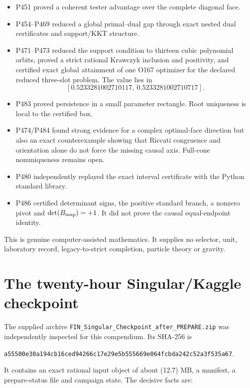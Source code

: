 \documentclass[11pt,a4paper]{article}
\theoremstyle{definition}
\theoremstyle{remark}
\begin{document}
\begin{itemize}
\item P451 proved a coherent tester advantage over the complete diagonal face.
\item P454--P469 reduced a global primal--dual gap through exact nested dual certificates and support/KKT structure.
\item P471--P473 reduced the support condition to thirteen cubic polynomial orbits, proved a strict rational Krawczyk inclusion and positivity, and certified exact global attainment of one O167 optimizer for the declared reduced three-slot problem. The value lies in
\[
[0.5233281002710117,\ 0.5233281002710717].
\]
\item P483 proved persistence in a small parameter rectangle. Root uniqueness is local to the certified box.
\item P474/P484 found strong evidence for a complex optimal-face direction but also an exact counterexample showing that Riccati congruence and orientation alone do not force the missing causal axis. Full-cone nonuniqueness remains open.
\item P480 independently replayed the exact interval certificate with the Python standard library.
\item P486 certified determinant signs, the positive standard branch, a nonzero pivot and $\det(B_{\rm map})=+1$. It did not prove the causal equal-endpoint identity.
\end{itemize}

This is genuine computer-assisted mathematics. It supplies no selector, unit, laboratory record, legacy-to-strict completion, particle theory or gravity.

\section{The twenty-hour Singular/Kaggle checkpoint}

The supplied archive \texttt{FIN\_Singular\_Checkpoint\_after\_PREPARE.zip} was independently inspected for this compendium. Its SHA-256 is
\begin{center}
\small\texttt{a55500e30a194cb16ced94266c17e29e5b555669e064fcbda242c52a3f535a67}.
\end{center}

It contains an exact rational input object of about (12.7) MB, a manifest, a prepare-status file and campaign state. The decisive facts are:
\end{document}
